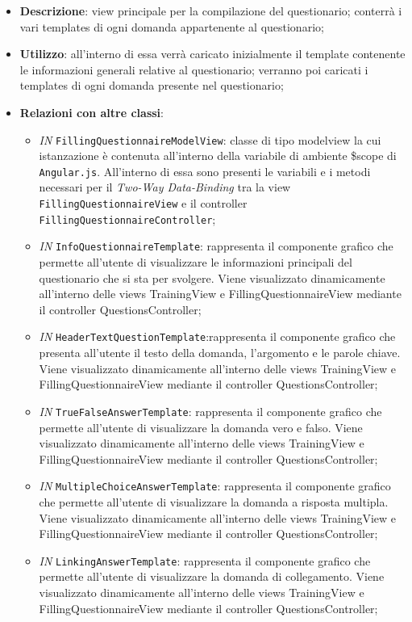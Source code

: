 \begin{itemize}
	\item \textbf{Descrizione}: view principale per la compilazione del questionario; conterrà i vari templates di ogni domanda appartenente al questionario;
	\item \textbf{Utilizzo}: all'interno di essa verrà caricato inizialmente il template contenente le informazioni generali relative al questionario; verranno poi caricati i templates di ogni domanda presente nel questionario;
	\item \textbf{Relazioni con altre classi}: 
	\begin{itemize}
		\item \textit{IN} \texttt{FillingQuestionnaireModelView}: classe di tipo modelview la cui istanzazione è contenuta all'interno della variabile di ambiente \$scope di \texttt{Angular.js}. All'interno di essa sono presenti le variabili e i metodi necessari per il \textit{Two-Way Data-Binding} tra la view \texttt{FillingQuestionnaireView} e il controller \texttt{FillingQuestionnaireController};
		\item \textit{IN} \texttt{InfoQuestionnaireTemplate}: rappresenta il componente grafico che permette all'utente di visualizzare le informazioni principali del questionario che si sta per svolgere. Viene visualizzato dinamicamente all'interno delle views TrainingView e FillingQuestionnaireView mediante il controller QuestionsController;
		\item \textit{IN} \texttt{HeaderTextQuestionTemplate}:rappresenta il componente grafico che presenta all'utente il testo della domanda, l'argomento e le parole chiave. Viene visualizzato dinamicamente all'interno delle views TrainingView e FillingQuestionnaireView mediante il controller QuestionsController;
		\item \textit{IN} \texttt{TrueFalseAnswerTemplate}: rappresenta il componente grafico che permette all'utente di visualizzare la domanda vero e falso. Viene visualizzato dinamicamente all'interno delle views TrainingView e FillingQuestionnaireView mediante il controller QuestionsController;
		\item \textit{IN} \texttt{MultipleChoiceAnswerTemplate}: rappresenta il componente grafico che permette all'utente di visualizzare la domanda a risposta multipla. Viene visualizzato dinamicamente all'interno delle views TrainingView e FillingQuestionnaireView mediante il controller QuestionsController;
		\item \textit{IN} \texttt{LinkingAnswerTemplate}: rappresenta il componente grafico che permette all'utente di visualizzare la domanda di collegamento. Viene visualizzato dinamicamente all'interno delle views TrainingView e FillingQuestionnaireView mediante il controller QuestionsController;

\end{itemize}
\end{itemize}
